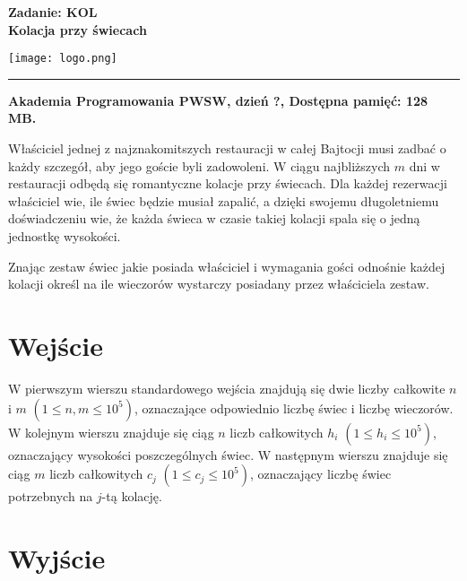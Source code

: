 \documentclass[10pt]{article}
\begin{document}
    

    \noindent
    \begin{minipage}{0.5\textwidth}
        \LARGE{\textsf{\textbf{Zadanie: KOL\\Kolacja przy świecach}}}
    \end{minipage}
    \begin{minipage}{0.5\textwidth}
        \begin{flushright}
            \texttt{[image: logo.png]}
        \end{flushright}
    \end{minipage}
    
    \noindent\rule{\textwidth}{0.4pt}
    
    \noindent\textbf{Akademia Programowania PWSW, dzień ?, Dostępna pamięć: 128 MB.}
    \vspace{1em}
    
    
    \noindent
    Właściciel jednej z najznakomitszych restauracji w całej Bajtocji musi zadbać o każdy szczegół, aby jego goście byli zadowoleni. W ciągu najbliższych $m$ dni w restauracji odbędą się romantyczne kolacje przy świecach. Dla każdej rezerwacji właściciel wie, ile świec będzie musiał zapalić, a dzięki swojemu długoletniemu doświadczeniu wie, że każda świeca w czasie takiej kolacji spala się o jedną jednostkę wysokości.
    
    Znając zestaw świec jakie posiada właściciel i wymagania gości odnośnie każdej kolacji określ na ile wieczorów wystarczy posiadany przez właściciela zestaw.


    \section*{Wejście}
    
    W pierwszym wierszu standardowego wejścia znajdują się dwie liczby całkowite $n$ i $m$ $(1\leq n, m\leq 10^{5})$, oznaczające odpowiednio liczbę świec i liczbę wieczorów. W kolejnym wierszu znajduje się ciąg $n$ liczb całkowitych $h_{i}$ $(1\leq h_{i}\leq 10^{5})$, oznaczający wysokości poszczególnych świec. W następnym wierszu znajduje się ciąg $m$ liczb całkowitych $c_{j}$ $(1\leq c_{j}\leq 10^{5})$, oznaczający liczbę świec potrzebnych na $j$-tą kolację.


    \section*{Wyjście}
    
\end{document}
